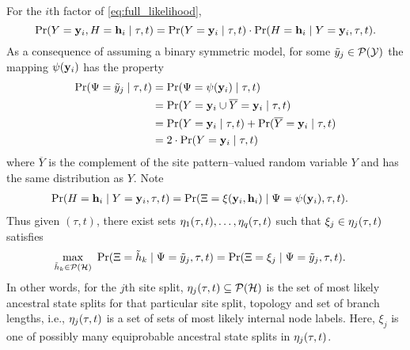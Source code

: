 For the $i$th factor of \eqref{eq:full_likelihood},
\[
\Pr(Y=\mathbf{y}_i, H=\mathbf{h}_i \mid \tau, t) = \Pr(Y=\mathbf{y}_i \mid \tau, t) \cdot \Pr(H=\mathbf{h}_i \mid Y=\mathbf{y}_i, \tau, t).
\]
As a consequence of assuming a binary symmetric model, for some $\tilde{y}_j\in\mathcal{P}(\mathcal{Y})$ the mapping $\psi(\mathbf{y}_i)$ has the property
\begin{align*}
    \Pr(\Psi=\tilde{y}_j \mid \tau, t) &= \Pr(\Psi=\psi(\mathbf{y}_i) \mid \tau, t)\\
    &= \Pr(Y=\mathbf{y}_i \cup \overline{Y}=\mathbf{y}_i \mid \tau, t)\\
    &= \Pr(Y=\mathbf{y}_i \mid \tau, t) + \Pr(\overline{Y}=\mathbf{y}_i \mid \tau, t)\\
    &= 2\cdot\Pr(Y=\mathbf{y}_i \mid \tau, t)
\end{align*}
where $\overline{Y}$ is the complement of the site pattern--valued random variable $Y$ and has the same distribution as $Y$.
Note
\begin{align*}
    \Pr(H=\mathbf{h}_i \mid Y=\mathbf{y}_i, \tau, t) &= \Pr(\Xi=\xi(\mathbf{y}_i, \mathbf{h}_i) \mid \Psi=\psi(\mathbf{y}_i), \tau, t).
\end{align*}
Thus given $(\tau, t)$, there exist sets $\eta_1(\tau, t),\ldots,\eta_q(\tau, t)$ such that $\xi_j\in\eta_j(\tau, t)$ satisfies
\begin{align*}
\max_{\ancestralSplit_k\in\mathcal{P}(\ancestralSplitSet)} \ \Pr(\ancestralSplitRV=\ancestralSplit_k \mid \siteSplitRV=\siteSplit_j, \tau, t) &= \Pr(\ancestralSplitRV = \xi_j \mid \siteSplitRV=\siteSplit_j, \tau, t).
\end{align*}
In other words, for the $j$th site split, $\eta_j(\tau, t)\subseteq\mathcal{P}(\mathcal{H})$ is the set of most likely ancestral state splits for that particular site split, topology and set of branch lengths, i.e., $\eta_j(\tau, t)$ is a set of sets of most likely internal node labels.
Here, $\xi_j$ is one of possibly many equiprobable ancestral state splits in $\eta_j(\tau, t)$.
